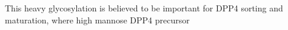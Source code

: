 This heavy glycosylation is believed to be important for DPP4 sorting and maturation, where high mannose DPP4 precursor \cite{Matter_1991}